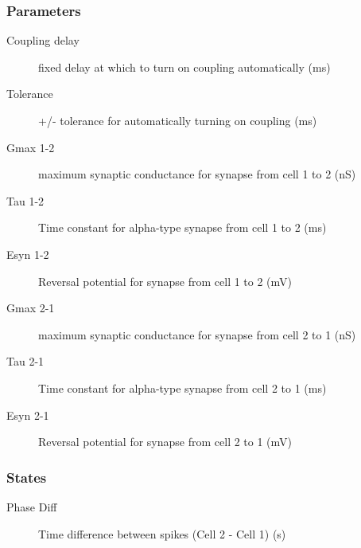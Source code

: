 \subsubsection{Parameters}
\begin{description}
\item[Coupling delay] fixed delay at which to turn on coupling automatically (ms)
\item[Tolerance] +/- tolerance for automatically turning on coupling (ms)
\item[Gmax 1-2] maximum synaptic conductance for synapse from cell 1 to 2 (nS)
\item[Tau 1-2] Time constant for alpha-type synapse from cell 1 to 2 (ms)
\item[Esyn 1-2] Reversal potential for synapse from cell 1 to 2 (mV)
\item[Gmax 2-1] maximum synaptic conductance for synapse from cell 2 to 1 (nS)
\item[Tau 2-1] Time constant for alpha-type synapse from cell 2 to 1 (ms)
\item[Esyn 2-1] Reversal potential for synapse from cell 2 to 1 (mV)
\end{description}

\subsubsection{States}
\begin{description}
\item[Phase Diff] Time difference between spikes (Cell 2 - Cell 1) (s)
\end{description}
